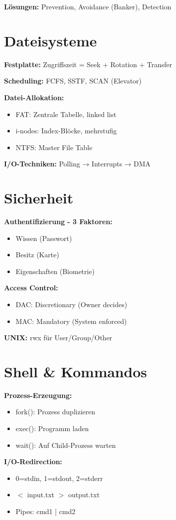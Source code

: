 \documentclass[10pt,a4paper]{article}
\begin{document}
\begin{multicols}{2}
\textbf{Lösungen:} Prevention, Avoidance (Banker), Detection

\section{Dateisysteme}
\textbf{Festplatte:} Zugriffszeit = Seek + Rotation + Transfer

\textbf{Scheduling:} FCFS, SSTF, SCAN (Elevator)

\textbf{Datei-Allokation:}
\begin{itemize}
\item FAT: Zentrale Tabelle, linked list
\item i-nodes: Index-Blöcke, mehrstufig
\item NTFS: Master File Table
\end{itemize}

\textbf{I/O-Techniken:} Polling → Interrupts → DMA

\section{Sicherheit}
\textbf{Authentifizierung - 3 Faktoren:}
\begin{itemize}
\item Wissen (Passwort)
\item Besitz (Karte)
\item Eigenschaften (Biometrie)
\end{itemize}

\textbf{Access Control:}
\begin{itemize}
\item DAC: Discretionary (Owner decides)
\item MAC: Mandatory (System enforced)
\end{itemize}

\textbf{UNIX:} rwx für User/Group/Other

\section{Shell \& Kommandos}
\textbf{Prozess-Erzeugung:}
\begin{itemize}
\item fork(): Prozess duplizieren
\item exec(): Programm laden
\item wait(): Auf Child-Prozess warten
\end{itemize}

\textbf{I/O-Redirection:}
\begin{itemize}
\item 0=stdin, 1=stdout, 2=stderr
\item $<$ input.txt $>$ output.txt
\item Pipes: cmd1 | cmd2
\end{itemize}


\end{multicols}
\end{document}
